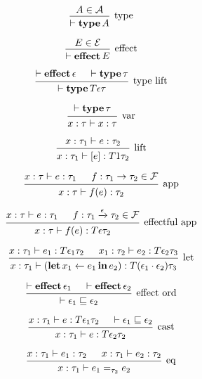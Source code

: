 \documentclass[12pt]{article}
\begin{document}
\pagestyle{empty}

\[
  \begin{prooftree}
    \hypo{A \in \mathcal{A}}
    \infer1[type]{\vdash \mathop{\mathbf{type}} A}
  \end{prooftree}
\]

\[
  \begin{prooftree}
    \hypo{E \in \mathcal{E}}
    \infer1[effect]{\vdash \mathop{\mathbf{effect}} E}
  \end{prooftree}
\]

\[
  \begin{prooftree}
    \hypo{\vdash \mathop{\mathbf{effect}} \epsilon}
    \hypo{\vdash \mathop{\mathbf{type}} \tau}
    \infer2[type lift]{\vdash \mathop{\mathbf{type}} T \epsilon \tau}
  \end{prooftree}
\]

\[
  \begin{prooftree}
    \hypo{\vdash \mathop{\mathbf{type}} \tau}
    \infer1[var]{x: \tau \vdash x: \tau}
  \end{prooftree}
\]

\[
  \begin{prooftree}
    \hypo{x: \tau_1 \vdash e: \tau_2}
    \infer1[lift]{x: \tau_1 \vdash [e]: T 1 \tau_2}
  \end{prooftree}
\]

\[
  \begin{prooftree}
    \hypo{x: \tau \vdash e: \tau_1}
    \hypo{f: \tau_1 \to \tau_2 \in \mathcal{F}}
    \infer2[app]{x: \tau \vdash f(e): \tau_2}
  \end{prooftree}
\]

\[
  \begin{prooftree}
    \hypo{x: \tau \vdash e: \tau_1}
    \hypo{f: \tau_1 \xrightarrow{\epsilon} \tau_2 \in \mathcal{F}}
    \infer2[effectful app]{x: \tau \vdash f(e): T \epsilon \tau_2}
  \end{prooftree}
\]

\[
  \begin{prooftree}
    \hypo{x: \tau_1 \vdash e_1: T \epsilon_1 \tau_2}
    \hypo{x_1: \tau_2 \vdash e_2: T \epsilon_2 \tau_3}
    \infer2[let]{x: \tau_1 \vdash (\mathop{\mathbf{let}} x_1 \gets e_1 \mathop{\mathbf{in}} e_2): T (\epsilon_1 \cdot \epsilon_2) \tau_3}
  \end{prooftree}
\]

\[
  \begin{prooftree}
    \hypo{\vdash \mathop{\mathbf{effect}} \epsilon_1}
    \hypo{\vdash \mathop{\mathbf{effect}} \epsilon_2}
    \infer2[effect ord]{\vdash \epsilon_1 \sqsubseteq \epsilon_2}
  \end{prooftree}
\]

\[
  \begin{prooftree}
    \hypo{x: \tau_1 \vdash e: T \epsilon_1 \tau_2}
    \hypo{\vdash \epsilon_1 \sqsubseteq \epsilon_2}
    \infer2[cast]{x: \tau_1 \vdash e: T \epsilon_2 \tau_2}
  \end{prooftree}
\]

\[
  \begin{prooftree}
    \hypo{x: \tau_1 \vdash e_1: \tau_2}
    \hypo{x: \tau_1 \vdash e_2: \tau_2}
    \infer2[eq]{x: \tau_1 \vdash e_1 =_{\tau_2} e_2}
  \end{prooftree}
\]
\end{document}
